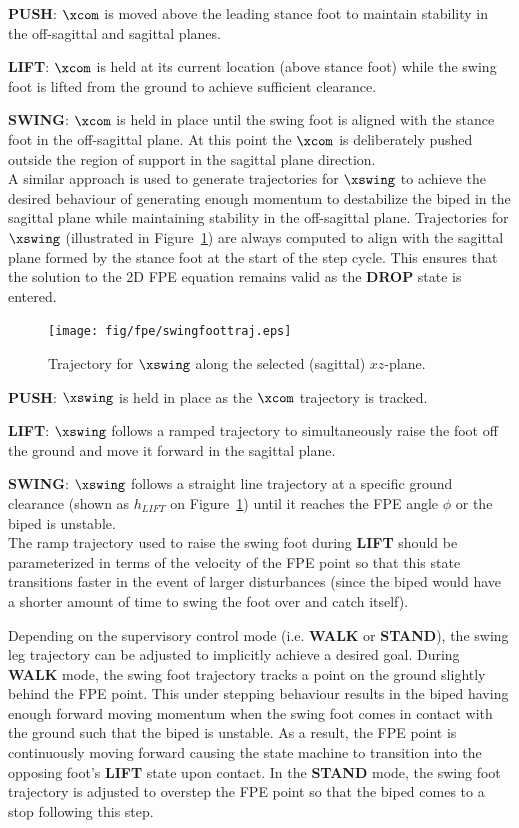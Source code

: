 \textbf{PUSH}: $\xcom$ is moved above the leading stance foot to maintain stability in the off-sagittal and sagittal planes.

\textbf{LIFT}: $\xcom$ is held at its current location (above stance foot) while the swing foot is lifted from the ground to achieve sufficient clearance.

\textbf{SWING}: $\xcom$ is held in place until the swing foot is aligned with the stance foot in the off-sagittal plane. At this point the $\xcom$ is deliberately pushed outside the region of support in the sagittal plane direction. \\

A similar approach is used to generate trajectories for $\xswing$ to achieve the desired behaviour of generating enough momentum to destabilize the biped in the sagittal plane while maintaining stability in the off-sagittal plane. Trajectories for $\xswing$ (illustrated in Figure~\ref{fig:swingfoottraj}) are always computed to align with the sagittal plane formed by the stance foot at the start of the step cycle. This ensures that the solution to the 2D FPE equation remains valid as the \textbf{DROP} state is entered. \\

\begin{figure}[!b]
	\centering
    \texttt{[image: fig/fpe/swingfoottraj.eps]} 
  	\caption{Trajectory for $\xswing$ along the selected (sagittal) $xz$-plane.}
	\label{fig:swingfoottraj}
\end{figure}

\textbf{PUSH}: $\xswing$ is held in place as the $\xcom$ trajectory is tracked.

\textbf{LIFT}: $\xswing$ follows a ramped trajectory to simultaneously raise the foot off the ground and move it forward in the sagittal plane.

\textbf{SWING}: $\xswing$ follows a straight line trajectory at a specific ground clearance (shown as $h_{LIFT}$ on Figure~\ref{fig:swingfoottraj}) until it reaches the FPE angle $\phi$ or the biped is unstable. \\

The ramp trajectory used to raise the swing foot during \textbf{LIFT} should be parameterized in terms of the velocity of the FPE point so that this state transitions faster in the event of larger disturbances (since the biped would have a shorter amount of time to swing the foot over and catch itself).

Depending on the supervisory control mode (i.e. \textbf{WALK} or \textbf{STAND}), the swing leg trajectory can be adjusted to implicitly achieve a desired goal. During \textbf{WALK} mode, the swing foot trajectory tracks a point on the ground slightly behind the FPE point. This under stepping behaviour results in the biped having enough forward moving momentum when the swing foot comes in contact with the ground such that the biped is unstable. As a result, the FPE point is continuously moving forward causing the state machine to transition into the opposing foot's \textbf{LIFT} state upon contact. In the \textbf{STAND} mode, the swing foot trajectory is adjusted to overstep the FPE point so that the biped comes to a stop following this step.

